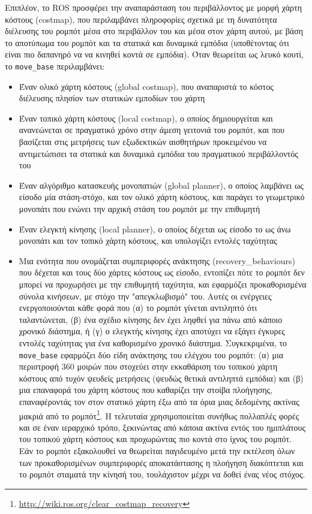 Επιπλέον, το ROS προσφέρει την αναπαράσταση του περιβάλλοντος με μορφή
χάρτη κόστους (costmap), που περιλαμβάνει πληροφορίες σχετικά με τη δυνατότητα
διέλευσης του ρομπότ μέσα στο περιβάλλον του και μέσα στον χάρτη αυτού, με βάση
το αποτύπωμα του ρομπότ και τα στατικά και δυναμικά εμπόδια (υποθέτοντας ότι
είναι πιο δαπανηρό να να κινηθεί κοντά σε εμπόδια). Όταν θεωρείται ως λευκό
κουτί, το \texttt{move\_base} περιλαμβάνει:

\begin{itemize}
  \item Έναν ολικό χάρτη κόστους (global costmap), που αναπαριστά το κόστος
        διέλευσης πλησίον των στατικών εμποδίων του χάρτη
  \item Έναν τοπικό χάρτη κόστους (local costmap), ο οποίος δημιουργείται και
        ανανεώνεται σε πραγματικό χρόνο στην άμεση γειτονιά του ρομπότ, και που
        βασίζεται στις μετρήσεις των εξωδεκτικών αισθητήρων προκειμένου να
        αντιμετώπισει τα στατικά και δυναμικά εμπόδια του πραγματικού
        περιβάλλοντός του
  \item Έναν αλγόριθμο κατασκευής μονοπατιών (global planner), ο οποίος λαμβάνει
        ως είσοδο μία στάση-στόχο, και τον ολικό χάρτη κόστους, και παράγει το
        γεωμετρικό μονοπάτι που ενώνει την αρχική στάση του ρομπότ με την
        επιθυμητή
  \item Έναν ελεγκτή κίνησης (local planner), ο οποίος δέχεται ως είσοδο το ως
        άνω μονοπάτι και τον τοπικό χάρτη κόστους, και υπολογίζει εντολές
        ταχύτητας
  \item Μια ενότητα που ονομάζεται συμπεριφορές ανάκτησης (recovery\_behaviours)
        που δέχεται και τους δύο χάρτες κόστους ως είσοδο, εντοπίζει πότε το
        ρομπότ δεν μπορεί να προχωρήσει με την επιθυμητή ταχύτητα, και
        εφαρμόζει προκαθορισμένα σύνολα κινήσεων, με στόχο την "απεγκλωβισμό"
        του. Αυτές οι ενέργειες ενεργοποιούνται κάθε φορά που (α) το ρομπότ
        γίνεται αντιληπτό ότι ταλαντώνεται, (β) ένα σχέδιο κίνησης δεν έχει
        ληφθεί για πάνω από κάποιο χρονικό διάστημα, ή (γ) ο ελεγκτής κίνησης
        έχει αποτύχει να εξάγει έγκυρες εντολές ταχύτητας για ένα καθορισμένο
        χρονικό διάστημα. Συγκεκριμένα, το \texttt{move\_base} εφαρμόζει δύο
        είδη ανάκτησης του ελέγχου του ρομπότ: (α) μια περιστροφή $360$ μοιρών
        που στοχεύει στην εκκαθάριση του τοπικού χάρτη κόστους από τυχόν
        ψευδείς μετρήσεις (ψευδώς θετικά αντιληπτά εμπόδια) και (β) μια
        επαναφορά του χάρτη κόστους που καθαρίζει την στοίβα πλοήγησης,
        επαναφέροντάς τον στον στατικό χάρτη έξω από τα όρια μιας δεδομένης
        ακτίνας μακριά από το
        ρομπότ\footnote{\url{http://wiki.ros.org/clear\_costmap\_recovery}}. Η
        τελευταία χρησιμοποιείται συνήθως πολλαπλές φορές και σε έναν ιεραρχικό
        τρόπο, ξεκινώντας από κάποια ακτίνα εντός του ημιπλάτους του τοπικού
        χάρτη κόστους και προχωρώντας πιο κοντά στο ίχνος του ρομπότ. Εάν το
        ρομπότ εξακολουθεί να θεωρείται παγιδευμένο μετά την εκτέλεση όλων των
        προκαθορισμένων συμπεριφορές αποκατάστασης η πλοήγηση διακόπτεται και
        το ρομπότ σταματά την κίνησή του, τουλάχιστον μέχρι να δοθεί ένας νέος
        στόχος.
\end{itemize}



